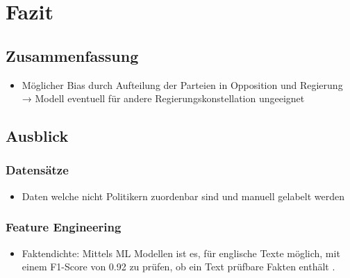 
\chapter{Fazit} \label{ch:conclusion}

\section{Zusammenfassung}

\begin{itemize}
    \item Möglicher Bias durch Aufteilung der Parteien in Opposition und Regierung → Modell eventuell für andere Regierungskonstellation ungeeignet
\end{itemize}

\section{Ausblick}

\subsection{Datensätze}

\begin{itemize}
    \item Daten welche nicht Politikern zuordenbar sind und manuell gelabelt werden
\end{itemize}

\subsection{Feature Engineering}

\begin{itemize}
    \item Faktendichte: Mittels \ac{ML} Modellen ist es, für englische Texte möglich, mit einem F1-Score von \num{0.92} zu prüfen, ob ein Text prüfbare Fakten enthält \autocite{jha_towards_2023}.
\end{itemize}
